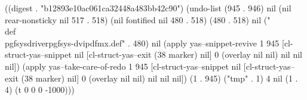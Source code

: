 
((digest . "b12893e10ac061ca32448a483bb42c90") (undo-list (945 . 946) nil (nil rear-nonsticky nil 517 . 518) (nil fontified nil 480 . 518) (480 . 518) nil ("\\def\\pgfsysdriver{pgfsys-dvipdfmx.def}" . 480) nil (apply yas--snippet-revive 1 945 [cl-struct-yas--snippet nil [cl-struct-yas--exit (38 marker) nil] 0 (overlay nil nil) nil nil nil]) (apply yas--take-care-of-redo 1 945 [cl-struct-yas--snippet nil [cl-struct-yas--exit (38 marker) nil] 0 (overlay nil nil) nil nil nil]) (1 . 945) ("tmp" . 1) 4 nil (1 . 4) (t 0 0 0 -1000)))
